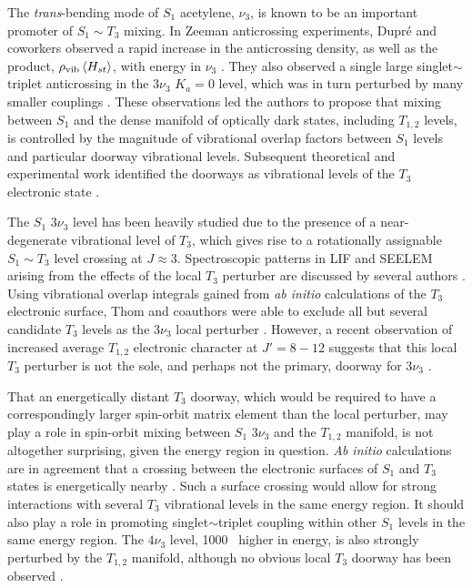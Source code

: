 \documentclass[12pt]{mitthesis}
\begin{document}
The \emph{trans}-bending mode of $S_1$ acetylene, $\nu_3$, is known to
be an important promoter of $S_1 \sim T_3$ mixing.  In Zeeman
anticrossing experiments, Dupr\'{e} and coworkers observed a rapid
increase in the anticrossing density, as well as the product,
$\rho_{\text{vib}} \mathinner{\langle{H_{st}}\rangle}$, with energy in $\nu_3$
\cite{dupre91, dupre95b}.  They also observed a single large
singlet$\sim$triplet anticrossing in the $3 \nu_3$ $K_a=0$ level,
which was in turn perturbed by many smaller couplings \cite{dupre93}.
These observations led the authors to propose that mixing between
$S_1$ and the dense manifold of optically dark states, including
$T_{1,2}$ levels, is controlled by the magnitude of vibrational
overlap factors between $S_1$ levels and particular doorway
vibrational levels.  Subsequent theoretical and experimental work
identified the doorways as vibrational levels of the $T_3$ electronic
state \cite{vacek96, sherrill96, humphrey97, altunata00}.

The $S_1$ $3 \nu_3$  level has been heavily studied due to the
presence of a near-degenerate vibrational level of $T_3$, which gives
rise to a rotationally assignable $S_1 \sim T_3$ level crossing at $J
\approx 3$.  Spectroscopic patterns in LIF and SEELEM arising from the
effects of the local $T_3$ perturber are discussed by several authors
\cite{humphrey97, altunata00, altunata01, mishra04}.  Using
vibrational overlap integrals gained from \emph{ab initio}
calculations of the $T_3$ electronic surface, Thom and coauthors were
able to exclude all but several candidate $T_3$ levels as the $3\nu_3$
local perturber \cite{thom07}.
However, a recent observation of increased average $T_{1,2}$
electronic character at $J'=8-12$ suggests that this local $T_3$
perturber is not the sole, and perhaps not the primary, doorway for $3
\nu_3$  \cite{degroot07}.

That an energetically distant $T_3$ doorway, which would be required
to have a correspondingly larger spin-orbit matrix element than the
local perturber, may play a role in spin-orbit mixing between $S_1$ $3
\nu_3$ and the $T_{1,2}$ manifold, is not altogether surprising, given
the energy region in question.  \emph{Ab initio} calculations are in
agreement that a crossing between the electronic surfaces of $S_1$ and
$T_3$ states is energetically nearby \cite{ventura03, thom07}.  Such a
surface crossing would allow for strong interactions with several
$T_3$ vibrational levels in the same energy region.  It should also
play a role in promoting singlet$\sim$triplet coupling within other
$S_1$ levels in the same energy region.  The $4\nu_3$ level, 1000
\rcm\ higher in energy, is also strongly perturbed by the $T_{1,2}$
manifold, although no obvious local $T_3$ doorway has been observed
\cite{drabbels94, ochi91}.
\end{document}
